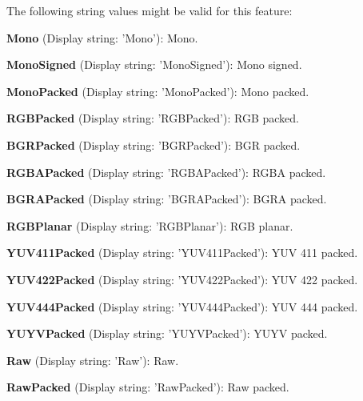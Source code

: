The following string values might be valid for this feature\+:
\begin{DoxyItemize}
\item {\bfseries Mono} (Display string\+: 'Mono')\+: Mono.
\item {\bfseries Mono\+Signed} (Display string\+: 'Mono\+Signed')\+: Mono signed.
\item {\bfseries Mono\+Packed} (Display string\+: 'Mono\+Packed')\+: Mono packed.
\item {\bfseries R\+G\+B\+Packed} (Display string\+: 'R\+G\+B\+Packed')\+: R\+G\+B packed.
\item {\bfseries B\+G\+R\+Packed} (Display string\+: 'B\+G\+R\+Packed')\+: B\+G\+R packed.
\item {\bfseries R\+G\+B\+A\+Packed} (Display string\+: 'R\+G\+B\+A\+Packed')\+: R\+G\+B\+A packed.
\item {\bfseries B\+G\+R\+A\+Packed} (Display string\+: 'B\+G\+R\+A\+Packed')\+: B\+G\+R\+A packed.
\item {\bfseries R\+G\+B\+Planar} (Display string\+: 'R\+G\+B\+Planar')\+: R\+G\+B planar.
\item {\bfseries Y\+U\+V411\+Packed} (Display string\+: 'Y\+U\+V411\+Packed')\+: Y\+U\+V 411 packed.
\item {\bfseries Y\+U\+V422\+Packed} (Display string\+: 'Y\+U\+V422\+Packed')\+: Y\+U\+V 422 packed.
\item {\bfseries Y\+U\+V444\+Packed} (Display string\+: 'Y\+U\+V444\+Packed')\+: Y\+U\+V 444 packed.
\item {\bfseries Y\+U\+Y\+V\+Packed} (Display string\+: 'Y\+U\+Y\+V\+Packed')\+: Y\+U\+Y\+V packed.
\item {\bfseries Raw} (Display string\+: 'Raw')\+: Raw.
\item {\bfseries Raw\+Packed} (Display string\+: 'Raw\+Packed')\+: Raw packed.
\end{DoxyItemize}

